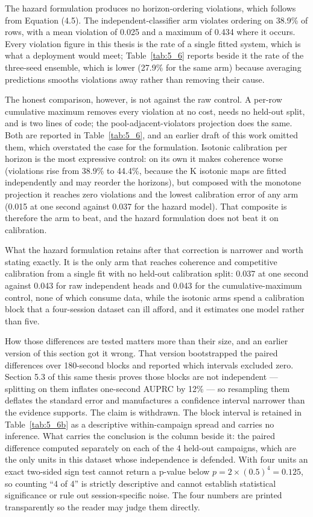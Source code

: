 The hazard formulation produces no horizon-ordering violations, which follows from Equation (4.5). The independent-classifier arm violates ordering on 38.9\% of rows, with a mean violation of 0.025 and a maximum of 0.434 where it occurs. Every violation figure in this thesis is the rate of a single fitted system, which is what a deployment would meet; Table~\ref{tab:5_6} reports beside it the rate of the three-seed ensemble, which is lower (27.9\% for the same arm) because averaging predictions smooths violations away rather than removing their cause.

The honest comparison, however, is not against the raw control. A per-row cumulative maximum removes every violation at no cost, needs no held-out split, and is two lines of code; the pool-adjacent-violators projection does the same. Both are reported in Table~\ref{tab:5_6}, and an earlier draft of this work omitted them, which overstated the case for the formulation. Isotonic calibration per horizon is the most expressive control: on its own it makes coherence worse (violations rise from 38.9\% to 44.4\%, because the K isotonic maps are fitted independently and may reorder the horizons), but composed with the monotone projection it reaches zero violations and the lowest calibration error of any arm (0.015 at one second against 0.037 for the hazard model). That composite is therefore the arm to beat, and the hazard formulation does not beat it on calibration.

What the hazard formulation retains after that correction is narrower and worth stating exactly. It is the only arm that reaches coherence and competitive calibration from a single fit with no held-out calibration split: 0.037 at one second against 0.043 for raw independent heads and 0.043 for the cumulative-maximum control, none of which consume data, while the isotonic arms spend a calibration block that a four-session dataset can ill afford, and it estimates one model rather than five.

How those differences are tested matters more than their size, and an earlier version of this section got it wrong. That version bootstrapped the paired differences over 180-second blocks and reported which intervals excluded zero. Section 5.3 of this same thesis proves those blocks are not independent --- splitting on them inflates one-second AUPRC by 12\% --- so resampling them deflates the standard error and manufactures a confidence interval narrower than the evidence supports. The claim is withdrawn. The block interval is retained in Table~\ref{tab:5_6b} as a descriptive within-campaign spread and carries no inference. What carries the conclusion is the column beside it: the paired difference computed separately on each of the 4 held-out campaigns, which are the only units in this dataset whose independence is defended. With four units an exact two-sided sign test cannot return a p-value below $p = 2 \times (0.5)^4 = 0.125$, so counting ``4 of 4'' is strictly descriptive and cannot establish statistical significance or rule out session-specific noise. The four numbers are printed transparently so the reader may judge them directly.

